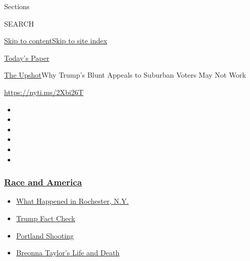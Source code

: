 Sections

SEARCH

\protect\hyperlink{site-content}{Skip to
content}\protect\hyperlink{site-index}{Skip to site index}

\href{https://myaccount.nytimes3xbfgragh.onion/auth/login?response_type=cookie\&client_id=vi}{}

\href{https://www.nytimes3xbfgragh.onion/section/todayspaper}{Today's
Paper}

\href{/section/upshot}{The Upshot}\textbar{}Why Trump's Blunt Appeals to
Suburban Voters May Not Work

\url{https://nyti.ms/2Xbi26T}

\begin{itemize}
\item
\item
\item
\item
\item
\item
\end{itemize}

\hypertarget{race-and-america}{%
\subsubsection{\texorpdfstring{\href{https://www.nytimes3xbfgragh.onion/news-event/george-floyd-protests-minneapolis-new-york-los-angeles?name=styln-george-floyd\&region=TOP_BANNER\&block=storyline_menu_recirc\&action=click\&pgtype=Article\&impression_id=fa37aaa0-f2c6-11ea-953d-8b1c0077ee87\&variant=undefined}{Race
and America}}{Race and America}}\label{race-and-america}}

\begin{itemize}
\tightlist
\item
  \href{https://www.nytimes3xbfgragh.onion/2020/09/04/nyregion/rochester-police-daniel-prude.html?name=styln-george-floyd\&region=TOP_BANNER\&block=storyline_menu_recirc\&action=click\&pgtype=Article\&impression_id=fa37d1b0-f2c6-11ea-953d-8b1c0077ee87\&variant=undefined}{What
  Happened in Rochester, N.Y.}
\item
  \href{https://www.nytimes3xbfgragh.onion/2020/09/01/us/politics/trump-fact-check-protests.html?name=styln-george-floyd\&region=TOP_BANNER\&block=storyline_menu_recirc\&action=click\&pgtype=Article\&impression_id=fa37d1b1-f2c6-11ea-953d-8b1c0077ee87\&variant=undefined}{Trump
  Fact Check}
\item
  \href{https://www.nytimes3xbfgragh.onion/2020/08/30/us/portland-shooting-explained.html?name=styln-george-floyd\&region=TOP_BANNER\&block=storyline_menu_recirc\&action=click\&pgtype=Article\&impression_id=fa37d1b2-f2c6-11ea-953d-8b1c0077ee87\&variant=undefined}{Portland
  Shooting}
\item
  \href{https://www.nytimes3xbfgragh.onion/2020/08/30/us/breonna-taylor-police-killing.html?name=styln-george-floyd\&region=TOP_BANNER\&block=storyline_menu_recirc\&action=click\&pgtype=Article\&impression_id=fa37d1b3-f2c6-11ea-953d-8b1c0077ee87\&variant=undefined}{Breonna
  Taylor's Life and Death}
\end{itemize}


